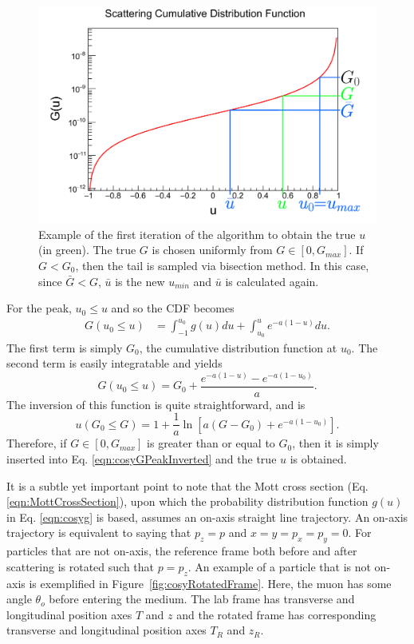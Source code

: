 \begin{figure}
  \centering
    \includegraphics[width=\textwidth]{Figures/scatdist_algorithm} 
  \caption[Example of the first iteration of the COSY CDF algorithm.]{Example of the first iteration of the algorithm to obtain the true $u$ (in green). The true $G$ is chosen uniformly from $G\in[0,G_{max}]$. If $G < G_0$, then the tail is sampled via bisection method. In this case, since $\bar{G} < G$, $\bar{u}$ is the new $u_{min}$ and $\bar{u}$ is calculated again.}
  \label{fig:scatdist_algorithm}
\end{figure}

For the peak, $u_0 \leq u$ and so the CDF becomes
\begin{align*}
G(u_0 \leq u)&=\int_{-1} ^{u_0} g(u) du + \int_{u_0} ^u e^{-a(1-u)} du.
\end{align*}
The first term is simply $G_0$, the cumulative distribution function at $u_0$. The second term is easily integratable and yields
\begin{equation}\label{eqn:cosyGPeak}
G(u_0 \leq u)=G_0 + \frac{e^{-a(1-u)}-e^{-a(1-u_0)}}{a}.
\end{equation}
The inversion of this function is quite straightforward, and is
\begin{equation} \label{eqn:cosyGPeakInverted}
u(G_0 \leq G)=1+\frac{1}{a} \ln \left[a(G-G_0)+e^{-a(1-u_0)}\right].
\end{equation}
Therefore, if $G \in [0,G_{max}]$ is greater than or equal to $G_0$, then it is simply inserted into Eq. \eqref{eqn:cosyGPeakInverted} and the true $u$ is obtained.

It is a subtle yet important point to note that the Mott cross section (Eq. \eqref{eqn:MottCrossSection}), upon which the probability distribution function $g(u)$ in Eq. \eqref{eqn:cosyg} is based, assumes an on-axis straight line trajectory. An on-axis trajectory is equivalent to saying that $p_z=p$ and $x=y=p_x = p_y =0$. For particles that are not on-axis, the reference frame both before and after scattering is rotated such that $p=p_z$. An example of a particle that is not on-axis is exemplified in Figure~\ref{fig:cosyRotatedFrame}. Here, the muon has some angle $\theta_o$ before entering the medium. The lab frame has transverse and longitudinal position axes $T$ and $z$ and the rotated frame has corresponding transverse and longitudinal position axes $T_R$ and $z_R$.  

